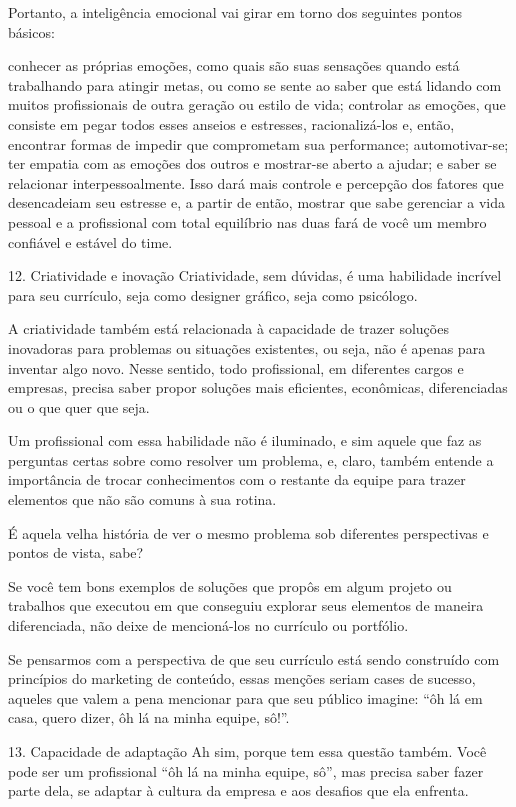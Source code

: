 \begin{commentA}
Portanto, a inteligência emocional vai girar em torno dos seguintes pontos básicos:

conhecer as próprias emoções, como quais são suas sensações quando está trabalhando para atingir metas, ou como se sente ao saber que está lidando com muitos profissionais de outra geração ou estilo de vida;
controlar as emoções, que consiste em pegar todos esses anseios e estresses, racionalizá-los e, então, encontrar formas de impedir que comprometam sua performance;
automotivar-se;
ter empatia com as emoções dos outros e mostrar-se aberto a ajudar; e
saber se relacionar interpessoalmente.
Isso dará mais controle e percepção dos fatores que desencadeiam seu estresse e, a partir de então, mostrar que sabe gerenciar a vida pessoal e a profissional com total equilíbrio nas duas fará de você um membro confiável e estável do time.

12. Criatividade e inovação
Criatividade, sem dúvidas, é uma habilidade incrível para seu currículo, seja como designer gráfico, seja como psicólogo.

A criatividade também está relacionada à capacidade de trazer soluções inovadoras para problemas ou situações existentes, ou seja, não é apenas para inventar algo novo. Nesse sentido, todo profissional, em diferentes cargos e empresas, precisa saber propor soluções mais eficientes, econômicas, diferenciadas ou o que quer que seja.

Um profissional com essa habilidade não é iluminado, e sim aquele que faz as perguntas certas sobre como resolver um problema, e, claro, também entende a importância de trocar conhecimentos com o restante da equipe para trazer elementos que não são comuns à sua rotina.

É aquela velha história de ver o mesmo problema sob diferentes perspectivas e pontos de vista, sabe?

Se você tem bons exemplos de soluções que propôs em algum projeto ou trabalhos que executou em que conseguiu explorar seus elementos de maneira diferenciada, não deixe de mencioná-los no currículo ou portfólio.

Se pensarmos com a perspectiva de que seu currículo está sendo construído com princípios do marketing de conteúdo, essas menções seriam cases de sucesso, aqueles que valem a pena mencionar para que seu público imagine: “ôh lá em casa, quero dizer, ôh lá na minha equipe, sô!”.

13. Capacidade de adaptação
Ah sim, porque tem essa questão também. Você pode ser um profissional “ôh lá na minha equipe, sô”, mas precisa saber fazer parte dela, se adaptar à cultura da empresa e aos desafios que ela enfrenta.


\end{commentA}
